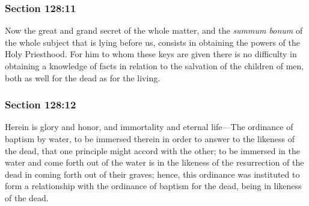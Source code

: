 
	\subsubsection{Section 128:11} %
		\label{DC128-11}

		Now the great and grand secret of the whole matter, and the \textit{summum bonum} of the whole subject that is lying before us, consists in obtaining the powers of the Holy Priesthood. For him to whom these keys are given there is no difficulty in obtaining a knowledge of facts in relation to the salvation of the children of men, both as well for the dead as for the living.


	\subsubsection{Section 128:12} %
		\label{DC128-12}

		Herein is glory and honor, and immortality and eternal life---The ordinance of baptism by water, to be immersed therein in order to answer to the likeness of the dead, that one principle might accord with the other; to be immersed in the water and come forth out of the water is in the likeness of the resurrection of the dead in coming forth out of their graves; hence, this ordinance was instituted to form a relationship with the ordinance of baptism for the dead, being in likeness of the dead.


